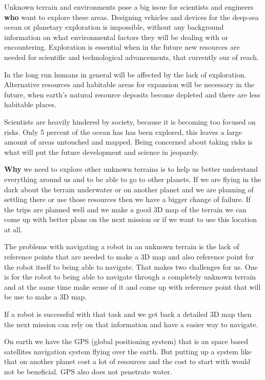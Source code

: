 Unknown terrain and environments pose a big issue for scientists and engineers \textbf{who} want to explore these areas. Designing vehicles and devices for the deep-sea ocean or planetary exploration is impossible, without any background information on what environmental factors they will be dealing with or encountering. Exploration is essential when in the future new resources are needed for scientific and technological advancements, that currently our of reach.

In the long run humans in general will be affected by the lack of exploration. Alternative resources and habitable areas for expansion will be necessary in the future, when earth's natural resource deposits become depleted and there are less habitable places. 

Scientists are heavily hindered by society, because it is becoming too focused on risks. Only 5 percent of the ocean has has been explored, this leaves a large amount of areas untouched and mapped. Being concerned about taking risks is what will put the future development and science in jeopardy.\cite{risksandexplo} 

\textbf{Why} we need to explore other unknown terrains is to help us better understand everything around us and to be able to go to other planets. If we are flying in the dark about the terrain underwater or on another planet and we are planning of settling there or use those resources then we have a bigger change of failure. If the trips are planned well and we make a good 3D map of the terrain we can come up with better plans on the next mission or if we want to use this location at all. 

The problems with navigating a robot in an unknown terrain is the lack of reference points that are needed to make a 3D map and also reference point for the robot itself to being able to navigate. That makes two challenges for us. One is for the robot to being able to navigate through a completely unknown terrain and at the same time make sense of it and come up with reference point that will be use to make a 3D map.

If a robot is successful with that task and we get back a detailed 3D map then the next mission can rely on that information and have a easier way to navigate. 

On earth we have the GPS (global positioning system) that is an space based satellites navigation system flying over the earth\cite{gpsgeneral}. But putting up a system like that on another planet cost a lot of resources and the cost to start with would not be beneficial. GPS also does not penetrate water\cite{underwatergps}. 